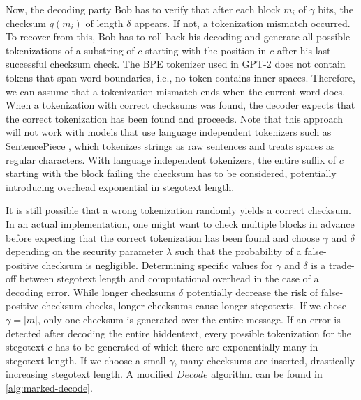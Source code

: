 Now, the decoding party Bob has to verify that after each block $m_i$ of $\gamma$ bits, the checksum $q(m_i)$ of length $\delta$ appears.
If not, a tokenization mismatch occurred.
To recover from this, Bob has to roll back his decoding and generate all possible tokenizations of a substring of $c$ starting with the position in $c$ after his last successful checksum check.
The BPE tokenizer used in GPT-2 does not contain tokens that span word boundaries, i.e., no token contains inner spaces. Therefore, we can assume that a tokenization mismatch ends when the current word does.
When a tokenization with correct checksums was found, the decoder expects that the correct tokenization has been found and proceeds.
Note that this approach will not work with models that use language independent tokenizers such as SentencePiece \cite{SentencePiece2018}, which tokenizes strings as raw sentences and treats spaces as regular characters.
With language independent tokenizers, the entire suffix of $c$ starting with the block failing the checksum has to be considered, potentially introducing overhead exponential in stegotext length.

It is still possible that a wrong tokenization randomly yields a correct checksum.
In an actual implementation, one might want to check multiple blocks in advance before expecting that the correct tokenization has been found and choose $\gamma$ and $\delta$ depending on the security parameter $\lambda$ such that the probability of a false-positive checksum is negligible.
Determining specific values for $\gamma$ and $\delta$ is a trade-off between stegotext length and computational overhead in the case of a decoding error.
While longer checksums $\delta$ potentially decrease the risk of false-positive checksum checks, longer checksums cause longer stegotexts.
If we chose $\gamma = |m|$, only one checksum is generated over the entire message. 
If an error is detected after decoding the entire hiddentext, every possible tokenization for the stegotext $c$ has to be generated of which there are exponentially many in stegotext length.
If we choose a small $\gamma$, many checksums are inserted, drastically increasing stegotext length.
A modified $Decode$ algorithm can be found in \autoref{alg:marked-decode}.

